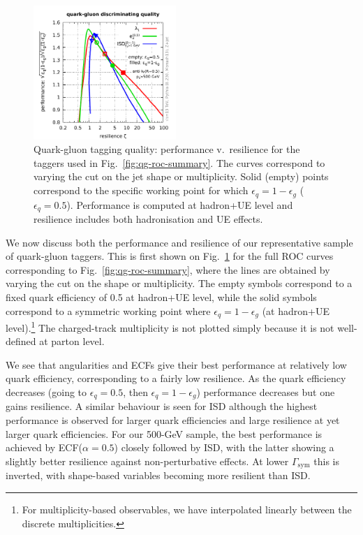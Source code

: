 \begin{figure}[t!]
  \centerline{\includegraphics[width=0.48\textwidth,page=1]{figures/qg-performance.pdf}}
  \caption{Quark-gluon tagging quality: performance v.\ resilience for
    the taggers used in Fig.~\ref{fig:qg-roc-summary}. The curves
    correspond to varying the cut on the jet shape or
    multiplicity. Solid (empty) points correspond to the specific
    working point for which $\epsilon_q=1-\epsilon_g$
    ($\epsilon_q=0.5$). Performance is computed at hadron+UE level and
    resilience includes both hadronisation and UE
    effects.}\label{fig:qg-quality}
\end{figure}

We now discuss both the performance and resilience of our
representative sample of quark-gluon taggers. This is first shown on
Fig.~\ref{fig:qg-quality} for the full ROC curves corresponding to
Fig.~\ref{fig:qg-roc-summary}, \ie where the lines are obtained by
varying the cut on the shape or multiplicity. The empty symbols
correspond to a fixed quark efficiency of 0.5 at hadron+UE level,
while the solid symbols correspond to a symmetric working point where
$\epsilon_q=1-\epsilon_g$ (at hadron+UE level).\footnote{For
  multiplicity-based observables, we have interpolated linearly
  between the discrete multiplicities.} The charged-track
multiplicity is not plotted simply because it is not well-defined at
parton level.

We see that angularities and ECFs give their best performance at
relatively low quark efficiency, corresponding to a fairly low
resilience. As the quark efficiency decreases (going to
$\epsilon_q=0.5$, then $\epsilon_q=1-\epsilon_g$) performance
decreases but one gains resilience. A similar behaviour is seen for
ISD although the highest performance is observed for larger quark
efficiencies and large resilience at yet larger quark efficiencies.
%
For our 500-GeV sample, the best performance is achieved by
ECF($\alpha=0.5$) closely followed by ISD, with the latter showing a
slightly better resilience against non-perturbative effects.
%
At lower $\Gamma_\text{sym}$ this is inverted, with shape-based
variables becoming more resilient than ISD. 

